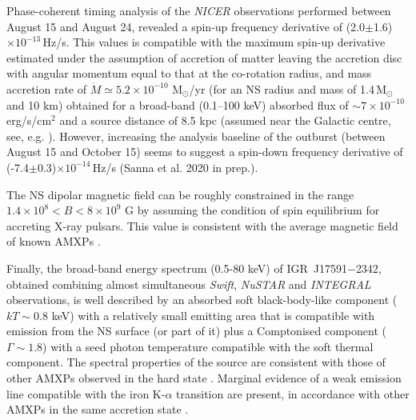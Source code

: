 \documentclass[graybox]{svmult}
\def \inte {{\em INTEGRAL\xspace}}
\def \swift {{\em Swift\xspace}}
\def \igrsev{{\rm IGR~J17591$-$2342\xspace}}
\def \nustar{{\em NuSTAR\xspace}}
\def \nicer{{\em NICER\xspace}}
\begin{document}
Phase-coherent timing analysis of the \nicer{} observations performed between August 15 and August 24, revealed a spin-up frequency derivative of (2.0$\pm$1.6)$\times 10^{-13}$\,Hz/s. 
This values is compatible with the maximum spin-up derivative estimated under the assumption of accretion of matter leaving the accretion disc with angular momentum equal to that at the co-rotation radius, and mass accretion rate of $\dot{M}\simeq5.2\times10^{-10}$ M$_{\odot}$/yr (for an NS radius and mass of 1.4\,M$_{\odot}$ and 10 km) obtained for a broad-band (0.1--100 keV) absorbed flux of $\sim7\times10^{-10}$ erg/s/cm$^2$ and a source distance of 8.5 kpc (assumed near the Galactic centre, see, e.g. \cite{Kerr1986}).
However, increasing the analysis baseline of the outburst (between August 15 and October 15) seems to suggest a spin-down frequency derivative of (-7.4$\pm$0.3)$\times 10^{-14}$\,Hz/s (Sanna et al. 2020 in prep.). 


The NS dipolar magnetic field can be roughly constrained in the range $1.4\times10^8<B<8\times 10^{9}$ G by assuming the condition of spin equilibrium for accreting X-ray pulsars. This value is consistent with the average magnetic field of known AMXPs \cite{Mukherjee2015}. 


Finally, the broad-band energy spectrum (0.5-80 keV) of \igrsev{}, obtained combining almost simultaneous \swift{}, \nustar{} and \inte{} observations, is well described by an absorbed soft black-body-like component ($kT\sim 0.8$ keV) with a relatively small emitting area that is compatible with emission from the NS surface (or part of it) plus a Comptonised component ($\Gamma \sim 1.8$) with a seed photon temperature compatible with the soft thermal component. The spectral properties of the source are consistent with those of other AMXPs observed in the hard state \cite{Falanga2005a,Gierlinski2005,Papitto2009, Papitto2013a,Sanna2017d,Sanna2017b}. Marginal evidence of a weak emission line compatible with the iron K-$\alpha$ transition are present, in accordance with other AMXPs in the same accretion state \cite{Sanna2017d,Sanna2017b}.








\end{document}
